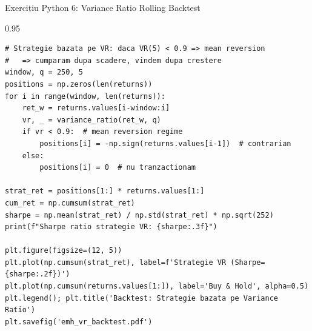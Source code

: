 \documentclass[9pt, aspectratio=169, t]{beamer}
\begin{document}
\begin{frame}[fragile]{Exercițiu Python 6: Variance Ratio Rolling Backtest}
    \begin{cminipage}{0.95\textwidth}
\begin{lstlisting}[basicstyle=\ttfamily\scriptsize]
# Strategie bazata pe VR: daca VR(5) < 0.9 => mean reversion
#   => cumparam dupa scadere, vindem dupa crestere
window, q = 250, 5
positions = np.zeros(len(returns))
for i in range(window, len(returns)):
    ret_w = returns.values[i-window:i]
    vr, _ = variance_ratio(ret_w, q)
    if vr < 0.9:  # mean reversion regime
        positions[i] = -np.sign(returns.values[i-1])  # contrarian
    else:
        positions[i] = 0  # nu tranzactionam

strat_ret = positions[1:] * returns.values[1:]
cum_ret = np.cumsum(strat_ret)
sharpe = np.mean(strat_ret) / np.std(strat_ret) * np.sqrt(252)
print(f"Sharpe ratio strategie VR: {sharpe:.3f}")

plt.figure(figsize=(12, 5))
plt.plot(np.cumsum(strat_ret), label=f'Strategie VR (Sharpe={sharpe:.2f})')
plt.plot(np.cumsum(returns.values[1:]), label='Buy & Hold', alpha=0.5)
plt.legend(); plt.title('Backtest: Strategie bazata pe Variance Ratio')
plt.savefig('emh_vr_backtest.pdf')
\end{lstlisting}

    \end{cminipage}
\end{frame}
\end{document}
